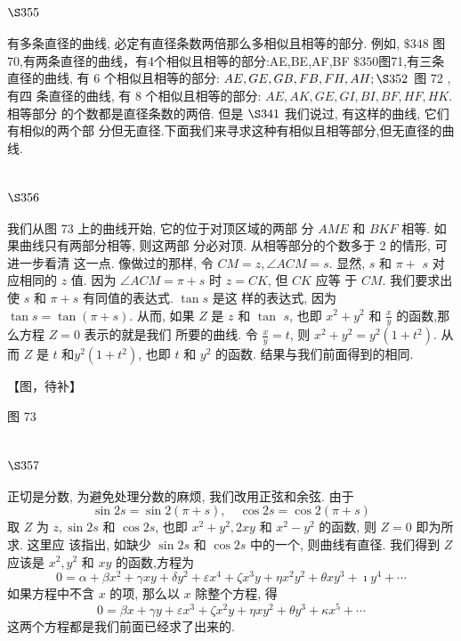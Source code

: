 \section{$\S 355$}

有多条直径的曲线, 必定有直径条数两倍那么多相似且相等的部分. 例如, $\$ 348$
图70,有两条直径的曲线，有4个相似且相等的部分:AE,BE,AF,BF  $\$ 350$图71,有三条直径的曲线, 有 6 个相似且相等的部分: $A E, G E, G B, F B, F H, A H ; \S 352$ 图 72 , 有四 条直径的曲线, 有 8 个相似且相等的部分: $A E, A K, G E, G I, B I, B F, H F, H K$. 相等部分 的个数都是直径条数的两倍. 但是 $\S 341$ 我们说过, 有这样的曲线, 它们有相似的两个部 分但无直径.下面我们来寻求这种有相似且相等部分,但无直径的曲线.

\section{$\S 356$}

我们从图 73 上的曲线开始, 它的位于对顶区域的两部 分 $A M E$ 和 $B K F$ 相等. 如果曲线只有两部分相等, 则这两部 分必对顶. 从相等部分的个数多于 2 的情形, 可进一步看清 这一点. 像做过的那样, 令 $C M=z, \angle A C M=s$. 显然, $s$ 和 $\pi+$ $s$ 对应相同的 $z$ 值. 因为 $\angle A C M=\pi+s$ 时 $z=C K$, 但 $C K$ 应等 于 $C M$. 我们要求出使 $s$ 和 $\pi+s$ 有同值的表达式. $\tan s$ 是这 样的表达式, 因为 $\tan s=\tan (\pi+s)$. 从而, 如果 $Z$ 是 $z$ 和 $\tan$ $s$, 也即 $x^{2}+y^{2}$ 和 $\frac{x}{y}$ 的函数,那么方程 $Z=0$ 表示的就是我们 所要的曲线. 令 $\frac{x}{y}=t$, 则 $x^{2}+y^{2}=y^{2}\left(1+t^{2}\right)$. 从而 $Z$ 是 $t$ 和$y^{2}\left(1+t^{2}\right)$, 也即 $t$ 和 $y^{2}$ 的函数. 结果与我们前面得到的相同.


【图，待补】

图 73 



\section{$\S 357$}

正切是分数, 为避免处理分数的麻烦, 我们改用正弦和余弦. 由于
\[
\sin 2 s=\sin 2(\pi+s), \quad \cos 2 s=\cos 2(\pi+s)
\]
取 $Z$ 为 $z, \sin 2 s$ 和 $\cos 2 s$, 也即 $x^{2}+y^{2}, 2 x y$ 和 $x^{2}-y^{2}$ 的函数, 则 $Z=0$ 即为所求. 这里应 该指出, 如缺少 $\sin 2 s$ 和 $\cos 2 s$ 中的一个, 则曲线有直径. 我们得到 $Z$ 应该是 $x^{2}, y^{2}$ 和 $x y$ 的函数,方程为
\[
0=\alpha+\beta x^{2}+\gamma x y+\delta y^{2}+\varepsilon x^{4}+\zeta x^{3} y+\eta x^{2} y^{2}+\theta x y^{3}+\imath y^{4}+\cdots
\]
如果方程中不含 $x$ 的项, 那么以 $x$ 除整个方程, 得
\[
0=\beta x+\gamma y+\varepsilon x^{3}+\zeta x^{2} y+\eta x y^{2}+\theta y^{3}+\kappa x^{5}+\cdots
\]
这两个方程都是我们前面已经求了出来的.

